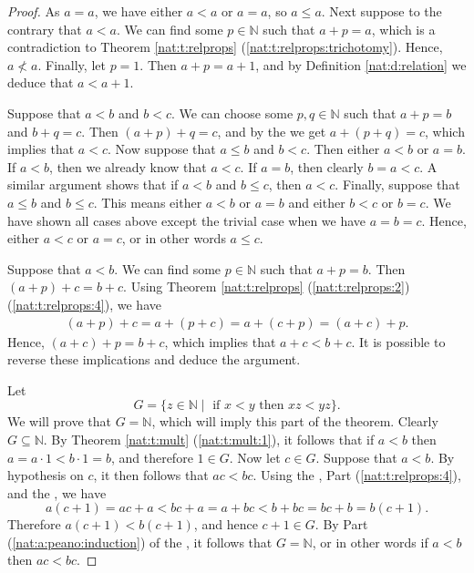 \begin{proof}
	\hfill

	As $a = a$, we have either $a < a$ or $a = a$, so $a \leq a$. Next suppose to the contrary that $a < a$. We can find some $p \in \mathbb{N}$ such that $a + p = a$, which is a contradiction to Theorem \ref{nat:t:relprops} (\ref{nat:t:relprops:trichotomy}). Hence, $a \nless a$. Finally, let $p = 1$. Then $a + p = a + 1$, and by Definition \ref{nat:d:relation} we deduce that $a < a + 1$.

	Suppose that $a < b$ and $b < c$. We can choose some $p, q \in \mathbb{N}$ such that $a + p = b$ and $b + q = c$. Then $(a + p) + q = c$, and by the  we get $a + (p + q) = c$, which implies that $a < c$. Now suppose that $a \leq b$ and $b < c$. Then either $a < b$ or $a = b$. If $a < b$, then we already know that $a < c$. If $a = b$, then clearly $b = a < c$. A similar argument shows that if $a < b$ and $b \leq c$, then $a < c$. Finally, suppose that $a \leq b$ and $b \leq c$. This means either $a < b$ or $a = b$ and either $b < c$ or $b = c$. We have shown all cases above except the trivial case when we have $a = b = c$. Hence, either $a < c$ or $a = c$, or in other words $a \leq c$.

	Suppose that $a < b$. We can find some $p \in \mathbb{N}$ such that $a + p = b$. Then $(a + p) + c = b + c$. Using Theorem \ref{nat:t:relprops} (\ref{nat:t:relprops:2}) (\ref{nat:t:relprops:4}), we have
	\begin{align*}
		(a + p) + c = a + (p + c) = a + (c + p) = (a + c) + p.
	\end{align*}
	Hence, $(a + c) + p = b + c$, which implies that $a + c < b + c$. It is possible to reverse these implications and deduce the argument.

	Let
	\[
		G = \{ z \in \mathbb{N} \mid \text{ if } x < y \text{ then } x z < y z \}.
	\]
	We will prove that $G = \mathbb{N}$, which will imply this part of the theorem. Clearly $G \subseteq \mathbb{N}$. By Theorem \ref{nat:t:mult} (\ref{nat:t:mult:1}), it follows that if $a < b$ then $a = a \cdot 1 < b \cdot 1 = b$, and therefore $1 \in G$.  Now let $c \in G$. Suppose that $a < b$. By hypothesis on $c$, it then follows that $a c < b c$. Using the , Part (\ref{nat:t:relprops:4}), and the , we have
	\[
		a(c + 1) = a c + a < b c + a = a + b c < b + b c = b c + b = b(c + 1).
	\]
	Therefore $a(c + 1) < b(c + 1)$, and hence $c + 1 \in G$. By Part (\ref{nat:a:peano:induction}) of the , it follows that $G = \mathbb{N}$, or in other words if $a < b$ then $a c < b c$.


\end{proof}
